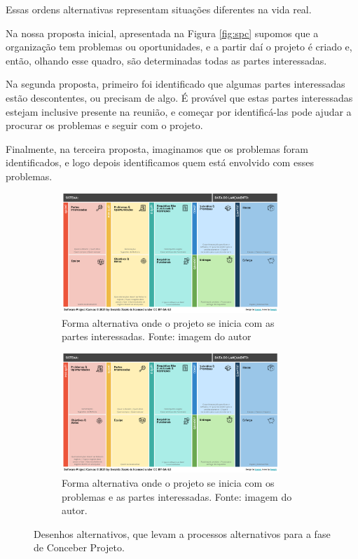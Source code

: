 \documentclass[a4]{report}
\begin{document}
Essas ordens alternativas representam situações diferentes na vida real.

Na nossa proposta inicial, apresentada na Figura \ref{fig:spc} supomos que a organização tem problemas ou oportunidades, e a partir daí o projeto é criado e, então, olhando esse quadro, são determinadas todas as partes interessadas.

Na segunda proposta, primeiro foi identificado que algumas partes interessadas estão descontentes, ou precisam de algo. É provável que estas partes interessadas estejam inclusive presente na reunião, e começar por identificá-las pode ajudar a procurar os problemas e seguir com o projeto.

Finalmente, na terceira proposta, imaginamos que os problemas foram identificados, e logo depois identificamos quem está envolvido com esses problemas.

\begin{figure}
    \centering
    \begin{subfigure}[b]{\textwidth}
    \centering
    \includegraphics[width=0.9\textwidth]{imagens/alternativa2.png}
    \caption{Forma alternativa onde o projeto se inicia com as partes interessadas. Fonte: imagem do autor}
    \label{fig:alter2}
    \end{subfigure}

    \vspace{1cm}

    \begin{subfigure}[b]{\textwidth}
    \centering
    \includegraphics[width=0.9\textwidth]{imagens/alternativa3.png}
    \caption{Forma alternativa onde o projeto se inicia com os problemas e as partes interessadas. Fonte: imagem do autor.}
    \label{fig:alter3}
    \end{subfigure}
    \caption{Desenhos alternativos, que levam a processos alternativos para a fase de Conceber Projeto.}
    \label{fig:alternativas}
\end{figure}
\end{document}
